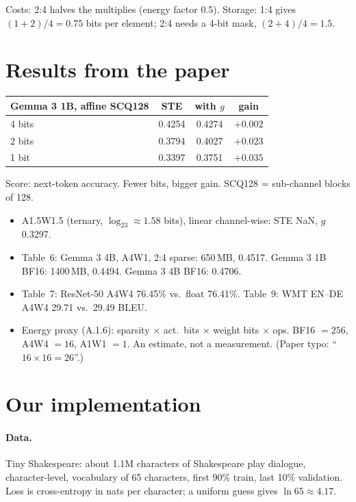 \documentclass[11pt]{article}
\begin{document}
Costs: 2:4 halves the multiplies (energy factor 0.5). Storage: 1:4 gives $(1+2)/4=0.75$ bits per element; 2:4 needs a 4-bit mask, $(2+4)/4=1.5$.

\section{Results from the paper}

\begin{center}
\begin{tabular}{lccc}
\toprule
Gemma 3 1B, affine SCQ128 & STE & with $g$ & gain\\
\midrule
4 bits & 0.4254 & 0.4274 & $+0.002$\\
2 bits & 0.3794 & 0.4027 & $+0.023$\\
1 bit & 0.3397 & 0.3751 & $+0.035$\\
\bottomrule
\end{tabular}
\end{center}
Score: next-token accuracy. Fewer bits, bigger gain. SCQ128 = sub-channel blocks of 128.
\begin{itemize}
\item A1.5W1.5 (ternary, $\log_23\approx1.58$ bits), linear channel-wise: STE NaN, $g$ 0.3297.
\item Table~6: Gemma 3 4B, A4W1, 2:4 sparse: 650\,MB, 0.4517. Gemma 3 1B BF16: 1400\,MB, 0.4494. Gemma 3 4B BF16: 0.4706.
\item Table~7: ResNet-50 A4W4 76.45\% vs.\ float 76.41\%. Table~9: WMT EN--DE A4W4 29.71 vs.\ 29.49 BLEU.
\item Energy proxy (A.1.6): sparsity $\times$ act.\ bits $\times$ weight bits $\times$ ops. BF16 $=256$, A4W4 $=16$, A1W1 $=1$. An estimate, not a measurement. (Paper typo: ``$16\times16=26$''.)
\end{itemize}

\section{Our implementation}

\paragraph{Data.} Tiny Shakespeare: about 1.1M characters of Shakespeare play dialogue, character-level, vocabulary of 65 characters, first 90\% train, last 10\% validation. Loss is cross-entropy in nats per character; a uniform guess gives $\ln65\approx4.17$.
\end{document}
